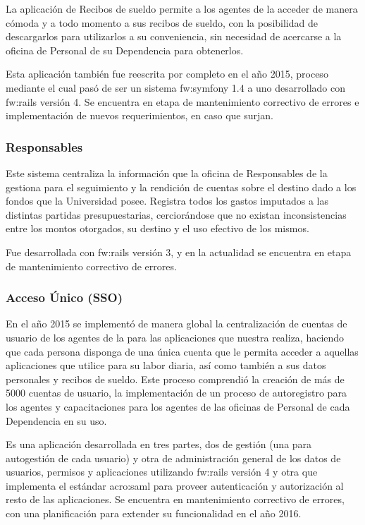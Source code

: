 La aplicación de Recibos de sueldo permite a los agentes de la {\unlp} acceder de manera cómoda y a todo momento a sus recibos de sueldo, con la posibilidad de descargarlos para utilizarlos a su conveniencia, sin necesidad de acercarse a la oficina de Personal de su Dependencia para obtenerlos.

Esta aplicación también fue reescrita por completo en el año 2015, proceso mediante el cual pasó de ser un sistema \gls{fw:symfony} 1.4 a uno desarrollado con \gls{fw:rails} versión 4. Se encuentra en etapa de mantenimiento correctivo de errores e implementación de nuevos requerimientos, en caso que surjan.


\subsubsection{Responsables}
\label{anexo:detalle-clientes:responsables}

Este sistema centraliza la información que la oficina de Responsables de la {\unlp} gestiona para el seguimiento y la rendición de cuentas sobre el destino dado a los fondos que la Universidad posee. Registra todos los gastos imputados a las distintas partidas presupuestarias, cerciorándose que no existan inconsistencias entre los montos otorgados, su destino y el uso efectivo de los mismos.

Fue desarrollada con \gls{fw:rails} versión 3, y en la actualidad se encuentra en etapa de mantenimiento correctivo de errores.


\subsubsection{Acceso Único (SSO)}
\label{anexo:detalle-clientes:sso}

En el año 2015 se implementó de manera global la centralización de cuentas de usuario de los agentes de la {\unlp} para las aplicaciones que nuestra {\direccionDesarrollo} realiza, haciendo que cada persona disponga de una única cuenta que le permita acceder a aquellas aplicaciones que utilice para su labor diaria, así como también a sus datos personales y recibos de sueldo. Este proceso comprendió la creación de más de 5000 cuentas de usuario, la implementación de un proceso de autoregistro para los agentes y capacitaciones para los agentes de las oficinas de Personal de cada Dependencia en su uso.

Es una aplicación desarrollada en tres partes, dos de gestión (una para autogestión de cada usuario) y otra de administración general de los datos de usuarios, permisos y aplicaciones utilizando \gls{fw:rails} versión 4 y otra que implementa el estándar \gls{acro:saml} para proveer autenticación y autorización al resto de las aplicaciones. Se encuentra en mantenimiento correctivo de errores, con una planificación para extender su funcionalidad en el año 2016.


